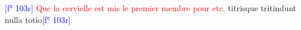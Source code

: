 \documentclass[11pt,a4paper, twoside, openany]{memoir}
\newcommand{\folio}[1]{\textcolor{blue}{[f° #1]}}
\newcommand{\titre}[1]{\textcolor{red}{#1}}
\begin{document}
\begin{pairs}
    \begin{Leftside}
        \beginnumbering
            \pstart
            \folio{103r}
            \lipsum[1-1] \titre{Que la cervielle est mis le premier membre pour etc.} \lipsum[2-2] titrisque tritindunt nulla totio\folio{103r} \lipsum[3-3]
            \pend
        \endnumbering
    \end{Leftside}
   \begin{Rightside}
        \beginnumbering
            \pstart
          \lipsum[3-5]
            \pend
        \endnumbering
    \end{Rightside}
\end{pairs}
\Columns
\end{document}

